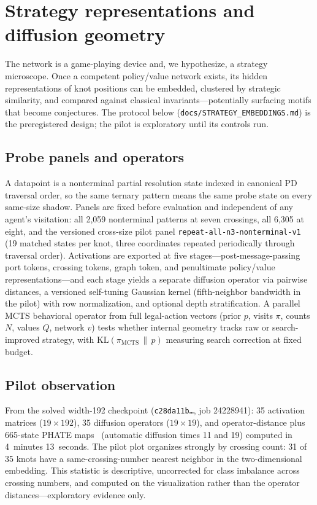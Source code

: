 \section{Strategy representations and diffusion geometry}
\label{sec:representations}

The network is a game-playing device and, we hypothesize, a strategy
microscope. Once a competent policy/value network exists, its hidden
representations of knot positions can be embedded, clustered by strategic
similarity, and compared against classical invariants---potentially surfacing
motifs that become conjectures. The protocol below
(\texttt{docs/STRATEGY\_EMBEDDINGS.md}) is the preregistered design; the pilot
is exploratory until its controls run.

\subsection{Probe panels and operators}
\label{sec:probes}

A datapoint is a nonterminal partial resolution state indexed in canonical PD
traversal order, so the same ternary pattern means the same probe state on
every same-size shadow. Panels are fixed before evaluation and independent of
any agent's visitation: all 2,059 nonterminal patterns at seven crossings, all
6,305 at eight, and the versioned cross-size pilot panel
\texttt{repeat-all-n3-nonterminal-v1} (19 matched states per knot, three
coordinates repeated periodically through traversal order). Activations are
exported at five stages---post-message-passing port tokens, crossing tokens,
graph token, and penultimate policy/value representations---and each stage
yields a separate diffusion operator via pairwise distances, a versioned
self-tuning Gaussian kernel (fifth-neighbor bandwidth in the pilot) with row
normalization, and optional depth stratification. A parallel MCTS behavioral
operator from full legal-action vectors (prior $p$, visits $\pi$, counts $N$,
values $Q$, network $v$) tests whether internal geometry tracks raw or
search-improved strategy, with $\mathrm{KL}(\pi_{\mathrm{MCTS}}\,\|\,p)$
measuring search correction at fixed budget.

\subsection{Pilot observation}
\label{sec:pilot}

From the solved width-192 checkpoint
(\texttt{c28da11b\ldots}, job 24228941): 35 activation matrices ($19 \times
192$), 35 diffusion operators ($19 \times 19$), and operator-distance plus
665-state PHATE maps~\cite{moon2019visualizing} (automatic diffusion times 11
and 19) computed in 4~minutes 13~seconds. The pilot plot organizes strongly by
crossing count: 31 of 35 knots have a same-crossing-number nearest neighbor in
the two-dimensional embedding. This statistic is descriptive, uncorrected for
class imbalance across crossing numbers, and computed on the visualization
rather than the operator distances---exploratory evidence only.

